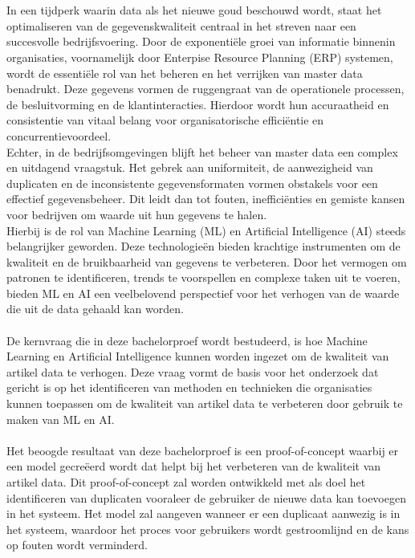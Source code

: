 
\chapter{}%
\label{ch:inleiding}

In een tijdperk waarin data als het nieuwe goud beschouwd wordt, staat het optimaliseren van de gegevenskwaliteit centraal in het streven naar een succesvolle bedrijfsvoering. Door de exponentiële groei van informatie binnenin organisaties, voornamelijk door Enterpise Resource Planning (ERP) systemen, wordt de essentiële rol van het beheren en het verrijken van master data benadrukt. Deze gegevens vormen de ruggengraat van de operationele processen, de besluitvorming en de klantinteracties. Hierdoor wordt hun accuraatheid en consistentie van vitaal belang voor organisatorische efficiëntie en concurrentievoordeel.
\\
Echter, in de bedrijfsomgevingen blijft het beheer van master data een complex en uitdagend vraagstuk. Het gebrek aan uniformiteit, de aanwezigheid van duplicaten en de inconsistente gegevensformaten vormen obstakels voor een effectief gegevensbeheer. Dit leidt dan tot fouten, inefficiënties en gemiste kansen voor bedrijven om waarde uit hun gegevens te halen. 
\\
Hierbij is de rol van Machine Learning (ML) en Artificial Intelligence (AI) steeds belangrijker geworden. Deze technologieën bieden krachtige instrumenten om de kwaliteit en de bruikbaarheid van gegevens te verbeteren. Door het vermogen om patronen te identificeren, trends te voorspellen en complexe taken uit te voeren, bieden ML en AI een veelbelovend perspectief voor het verhogen van de waarde die uit de data gehaald kan worden.
\\ \\
De kernvraag die in deze bachelorproef wordt bestudeerd, is hoe Machine Learning en Artificial Intelligence kunnen worden ingezet om de kwaliteit van artikel data te verhogen. Deze vraag vormt de basis voor het onderzoek dat gericht is op het identificeren van methoden en technieken die organisaties kunnen toepassen om de kwaliteit van artikel data te verbeteren door gebruik te maken van ML en AI.
\\ \\
Het beoogde resultaat van deze bachelorproef is een proof-of-concept waarbij er een model gecreëerd wordt dat helpt bij het verbeteren van de kwaliteit van artikel data. Dit proof-of-concept zal worden ontwikkeld met als doel het identificeren van duplicaten vooraleer de gebruiker de nieuwe data kan toevoegen in het systeem. Het model zal aangeven wanneer er een duplicaat aanwezig is in het systeem, waardoor het proces voor gebruikers wordt gestroomlijnd en de kans op fouten wordt verminderd.
